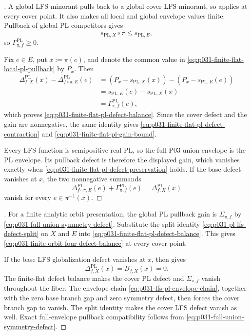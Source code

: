 \begin{proof}[]
A global LFS minorant pulls back to a global cover LFS minorant, so
 applies at every cover
point.  It also makes all local and global envelope values finite.  Pullback
of global PL competitors gives
\[
                   s_{\mathrm{PL},X}\circ\pi
                      \leq s_{\mathrm{PL},E},
\]
so $\Gamma^{\mathrm{PL}}_{\pi,f}\geq0$.

Fix $e\in E$, put $x:=\pi(e)$, and denote the common value in
\eqref{eq:p031-finite-flat-local-pl-pullback} by $P_x$.  Then
\begin{align*}
 \Delta^{\mathrm{PL}}_{f,X}(x)
   -\Delta^{\mathrm{PL}}_{f\circ\pi,E}(e)
  &=(P_x-s_{\mathrm{PL},X}(x))
      -(P_x-s_{\mathrm{PL},E}(e))\\
  &=s_{\mathrm{PL},E}(e)-s_{\mathrm{PL},X}(x)\\
  &=\Gamma^{\mathrm{PL}}_{\pi,f}(e),
\end{align*}
which proves \eqref{eq:p031-finite-flat-pl-defect-balance}.  Since the
cover defect and the gain are nonnegative, the same identity gives
\eqref{eq:p031-finite-flat-pl-defect-contraction} and
\eqref{eq:p031-finite-flat-pl-gain-bound}.

Every LFS function is semipositive real PL, so the full P03 union envelope
is the PL envelope.  Its pullback defect is therefore the displayed gain,
which vanishes exactly when
\eqref{eq:p031-finite-flat-pl-defect-preservation} holds.  If the base
defect vanishes at $x$, the two nonnegative summands
\[
 \Delta^{\mathrm{PL}}_{f\circ\pi,E}(e)
       +\Gamma^{\mathrm{PL}}_{\pi,f}(e)
       =\Delta^{\mathrm{PL}}_{f,X}(x)
\]
vanish for every $e\in\pi^{-1}(x)$.
\end{proof}

\begin{proof}[]
For a finite analytic orbit presentation, the global PL pullback gain is
$\Sigma_{\pi,f}$ by \eqref{eq:p031-full-union-symmetry-defect}.  Substitute
the split identity \eqref{eq:p031-pl-lfs-defect-split} on $X$ and $E$ into
\eqref{eq:p031-finite-flat-pl-defect-balance}.  This gives
\eqref{eq:p031-finite-orbit-four-defect-balance} at every cover point.

If the base LFS globalization defect vanishes at $x$, then
 gives
\[
             \Delta^{\mathrm{PL}}_{f,X}(x)=B_{f,X}(x)=0.
\]
The finite-flat defect balance makes the cover PL defect and
$\Sigma_{\pi,f}$ vanish throughout the fiber.  The envelope chain
\eqref{eq:p031-lfs-pl-envelope-chain}, together with the zero base branch
gap and zero symmetry defect, then forces the cover branch gap to vanish.
The split identity makes the cover LFS defect vanish as well.  Exact
full-envelope pullback compatibility follows from
\eqref{eq:p031-full-union-symmetry-defect}.
\end{proof}
